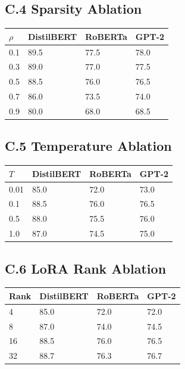 \subsection{C.4 Sparsity Ablation}

\begin{table}[H]
\centering
\small
\begin{tabular}{llll}
\toprule
\textbf{$\rho$} & \textbf{DistilBERT} & \textbf{RoBERTa} & \textbf{GPT-2} \\
\midrule
0.1 & 89.5 & 77.5 & 78.0 \\
0.3 & 89.0 & 77.0 & 77.5 \\
0.5 & 88.5 & 76.0 & 76.5 \\
0.7 & 86.0 & 73.5 & 74.0 \\
0.9 & 80.0 & 68.0 & 68.5 \\
\bottomrule
\end{tabular}
\end{table}

\subsection{C.5 Temperature Ablation}

\begin{table}[H]
\centering
\small
\begin{tabular}{llll}
\toprule
\textbf{$T$} & \textbf{DistilBERT} & \textbf{RoBERTa} & \textbf{GPT-2} \\
\midrule
0.01 & 85.0 & 72.0 & 73.0 \\
0.1 & 88.5 & 76.0 & 76.5 \\
0.5 & 88.0 & 75.5 & 76.0 \\
1.0 & 87.0 & 74.5 & 75.0 \\
\bottomrule
\end{tabular}
\end{table}

\subsection{C.6 LoRA Rank Ablation}

\begin{table}[H]
\centering
\small
\begin{tabular}{llll}
\toprule
\textbf{Rank} & \textbf{DistilBERT} & \textbf{RoBERTa} & \textbf{GPT-2} \\
\midrule
4 & 85.0 & 72.0 & 72.0 \\
8 & 87.0 & 74.0 & 74.5 \\
16 & 88.5 & 76.0 & 76.5 \\
32 & 88.7 & 76.3 & 76.7 \\
\bottomrule
\end{tabular}
\end{table}

